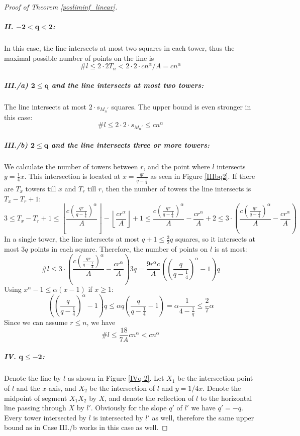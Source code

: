 \documentclass[11pt,a4paper]{article}
\numberwithin{equation}{section}
\begin{document}
\begin{proof}[Proof of Theorem \ref{posliminf_linear}]
    \subparagraph{\bf II. $\mathbf{-2 < q<2}$: }
    In this case, the line intersects at most two squares in each tower, thus the maximal possible number of points on the line is
	$$\# l \le 2\cdot 2T_n < 2\cdot 2\cdot cn^\alpha/A  =  cn^\alpha$$



    
    \subparagraph{\bf III./a) $\mathbf{2\le q}$ and the line intersects at most two towers: }
    The line intersects at most $2\cdot s_{M_n'}$ squares. The upper bound is even stronger in this case:
    $$\#l \le 2\cdot 2\cdot s_{M_n'}\le cn^\alpha$$

    \subparagraph{\bf III./b) $\mathbf{2\le q}$ and the line intersects three or more towers: } \label{haromb}
	We calculate the number of towers between $r$, and the point where $l$ intersects $y = \frac14x$. This intersection is located at $x = \frac{qr}{q- \frac14}$ as seen in Figure \ref{IIIbq2}.
    If there are $T_x$ towers till $x$ and $T_r$ till $r$, then the number of towers the line intersects is $ T_x - T_r + 1$:
    $$
    3\le T_x - T_r + 1\le \left\lfloor\frac{c\left(\frac{qr}{q- \frac14}\right)^\alpha }{A}\right\rfloor - \left\lfloor \frac{cr^\alpha}{A}\right\rfloor +1 \le \frac{c\left(\frac{qr}{q- \frac14}\right)^\alpha}{A} - \frac{cr^\alpha}{A} + 2 \le 3\cdot \left(\frac{c\left(\frac{qr}{q- \frac14}\right)^\alpha}{A} - \frac{cr^\alpha}{A}\right)
    $$
	In a single tower, the line intersects at most $q+1 \le \frac32q$ squares, so it intersects at most $3q$ points in each square. Therefore, the number of points on $l$ is at most:
    $$
    \#l \le 3\cdot\left(\frac{c\left(\frac{qr}{q- \frac14}\right)^\alpha}{A} - \frac{cr^\alpha}{A}\right)3q= \frac{ 9r^\alpha c}{A}\left(\left(\frac{q}{q-\frac14}\right)^\alpha - 1\right)q$$
    Using $x^\alpha -1 \le \alpha(x-1)$ if $x\ge 1$:
    $$
    \left(\left(\frac{q}{q-\frac14}\right)^\alpha - 1\right)q \le \alpha q \left(\frac{q}{q - \frac14 } - 1 \right) = \alpha\frac{ 1}{4 -\frac1q} \le \frac27 \alpha
    $$
    Since we can assume $r\le n$, we have
$$\# l \le \frac{18}{7A}cn^\alpha < cn^\alpha$$

\subparagraph{\bf IV.  $\mathbf{q\le -2}$:}
    Denote the line by $l$ as shown in Figure \ref{IVq-2}. Let $X_1$ be the intersection point of $l$ and the $x$-axis, and $X_2$ be the intersection of $l$ and $y = 1/4 x$. Denote the midpoint of segment $X_1X_2$ by $X$, and denote the reflection of $l$ to the horizontal line passing through $X$ by $l'$. Obviously for the slope $q'$ of $l'$ we have $q' = -q$. Every tower intersected by $l$ is intersected by $l'$ as well, therefore the same upper bound as in Case III./b works in this case as well.


\end{proof}
\end{document}
